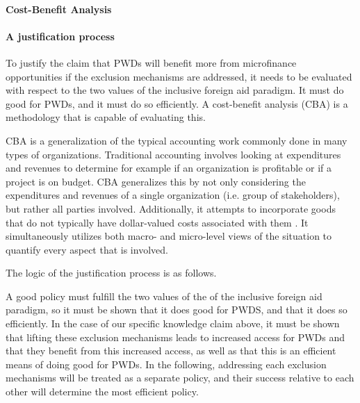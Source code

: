 \documentclass[a4paper]{article}
\begin{document}
\paragraph{Cost-Benefit Analysis}
\paragraph{A justification process}

To justify the claim that PWDs will benefit more from microfinance
opportunities if the exclusion mechanisms are addressed, it needs to be
evaluated with respect to the two values of the inclusive foreign aid
paradigm. It must do good for PWDs, and it must do so efficiently. A
cost-benefit analysis (CBA) is a methodology that is capable of evaluating
this.

CBA is a generalization of the typical accounting work commonly done in many
types of organizations. Traditional accounting involves looking at
expenditures and revenues to determine for example if an organization is
profitable or if a project is on budget. CBA generalizes this by not only
considering the expenditures and revenues of a single organization (i.e. group
of stakeholders), but rather all parties involved. Additionally, it attempts
to incorporate goods that do not typically have dollar-valued costs associated
with them \citep{mishan2015elements}. It simultaneously utilizes both macro-
and micro-level views of the situation to quantify every aspect that is
involved.

The logic of the justification process is as follows.

A good policy must fulfill the two values of the of the inclusive foreign aid
paradigm, so it must be shown that it does good for PWDS, and that it does so
efficiently. In the case of our specific knowledge claim above, it must be
shown that lifting these exclusion mechanisms leads to increased access for
PWDs and that they benefit from this increased access, as well as that this is
an efficient means of doing good for PWDs. In the following, addressing each
exclusion mechanisms will be treated as a separate policy, and their success
relative to each other will determine the most efficient policy.
\end{document}
